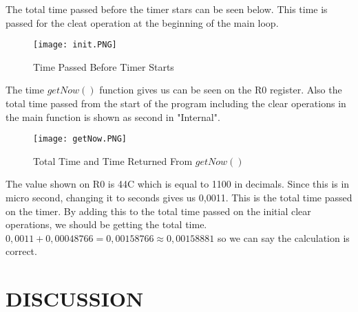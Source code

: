 \documentclass[pdftex,12pt,a4paper]{article}
\begin{document}
The total time passed before the timer stars can be seen below. This time is passed for the cleat operation at the beginning of the main loop. 

\begin{figure}[H]
	\centering
	\texttt{[image: init.PNG]}	
	\caption{Time Passed Before Timer Starts}
	\label{fig1}
\end{figure}

The time $getNow()$ function gives us can be seen on the R0 register. Also the total time passed from the start of the program including the clear operations in the main function is shown as second in "Internal".

\begin{figure}[H]
	\centering
	\texttt{[image: getNow.PNG]}	
	\caption{Total Time and Time Returned From $getNow()$}
	\label{fig1}
\end{figure}

The value shown on R0 is 44C which is equal to 1100 in decimals. Since this is in micro second, changing it to seconds gives us 0,0011. This is the total time passed on the timer. By adding this to the total time passed on the initial clear operations, we should be getting the total time. $0,0011 + 0,00048766 = 0,00158766 \approx 0,00158881$ so we can say the calculation is correct. 

\section{DISCUSSION}
\end{document}
